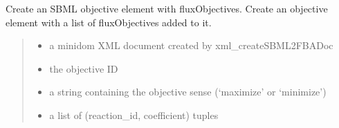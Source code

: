 \documentclass[letterpaper,12pt,english]{sphinxmanual}
\begin{document}
\begin{fulllineitems}
\label{\detokenize{api/io:cbmpy.CBXML.xml_createSBML2FBAObjective}}
\pysigstartsignatures
\pysiglinewithargsret
{}
{\sphinxparamcomma {}\sphinxparamcomma {}\sphinxparamcomma {}}
{}
\pysigstopsignatures
\sphinxAtStartPar
Create an SBML objective element with fluxObjectives. Create an objective element with a list of fluxObjectives added to it.
\begin{quote}\begin{description}
\begin{itemize}
\item {} 
\sphinxAtStartPar
{} \textendash{} a minidom XML document created by xml\_createSBML2FBADoc

\item {} 
\sphinxAtStartPar
{} \textendash{} the objective ID

\item {} 
\sphinxAtStartPar
{} \textendash{} a string containing the objective sense (‘maximize’ or ‘minimize’)

\item {} 
\sphinxAtStartPar
{} \textendash{} a list of (reaction\_id, coefficient) tuples

\end{itemize}

\sphinxAtStartPar
{}

\end{description}\end{quote}

\end{fulllineitems}

\end{document}
